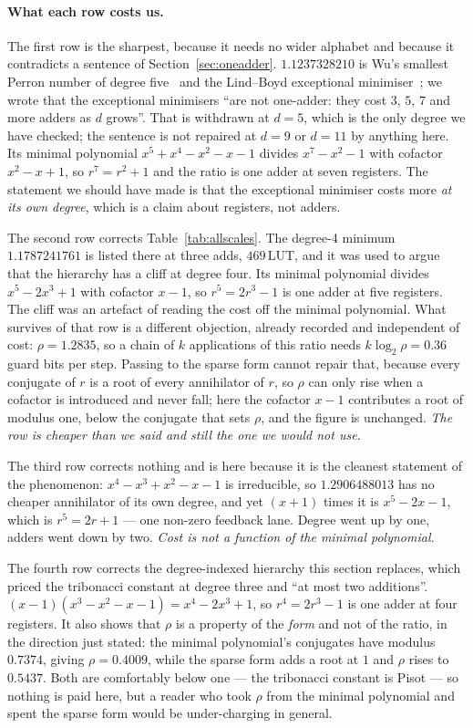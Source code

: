\documentclass[11pt]{article}
\theoremstyle{definition}
\begin{document}
\paragraph{What each row costs us.} The first row is the sharpest, because it
needs no wider alphabet and because it contradicts a sentence of
Section~\ref{sec:oneadder}. $1.1237328210$ is Wu's smallest Perron number of
degree five~\cite{wu2010} and the Lind--Boyd exceptional
minimiser~\cite{boyd1985}; we wrote that the exceptional minimisers ``are not
one-adder: they cost $3$, $5$, $7$ and more adders as $d$ grows''. That is
withdrawn at $d=5$, which is the only degree we have checked; the sentence is
not repaired at $d=9$ or $d=11$ by anything here. Its minimal polynomial
$x^5+x^4-x^2-x-1$ divides $x^7-x^2-1$ with cofactor $x^2-x+1$, so $r^7=r^2+1$
and the ratio is one adder at seven registers. The statement we should have made
is that the exceptional minimiser costs more \emph{at its own degree}, which is
a claim about registers, not adders.

The second row corrects Table~\ref{tab:allscales}. The degree-4 minimum
$1.1787241761$ is listed there at three adds, $469$\,LUT, and it was used to
argue that the hierarchy has a cliff at degree four. Its minimal polynomial
divides $x^5-2x^3+1$ with cofactor $x-1$, so $r^5=2r^3-1$ is one adder at five
registers. The cliff was an artefact of reading the cost off the minimal
polynomial. What survives of that row is a different objection, already recorded
and independent of cost: $\rho=1.2835$, so a chain of $k$ applications of this
ratio needs $k\log_2\rho=0.36$ guard bits per step. Passing to the sparse form
cannot repair that, because every conjugate of $r$ is a root of every
annihilator of $r$, so $\rho$ can only rise when a cofactor is introduced and
never fall; here the cofactor $x-1$ contributes a root of modulus one, below the
conjugate that sets $\rho$, and the figure is unchanged. \emph{The row is
cheaper than we said and still the one we would not use.}

The third row corrects nothing and is here because it is the cleanest statement
of the phenomenon: $x^4-x^3+x^2-x-1$ is irreducible, so $1.2906488013$ has no
cheaper annihilator of its own degree, and yet $(x+1)$ times it is $x^5-2x-1$,
which is $r^5=2r+1$ --- one non-zero feedback lane. Degree went up by one,
adders went down by two. \emph{Cost is not a function of the minimal
polynomial.}

The fourth row corrects the degree-indexed hierarchy this section replaces,
which priced the tribonacci constant at degree three and ``at most two
additions''. $(x-1)(x^3-x^2-x-1) = x^4-2x^3+1$, so $r^4=2r^3-1$ is one adder at
four registers. It also shows that $\rho$ is a property of the \emph{form} and
not of the ratio, in the direction just stated: the minimal polynomial's
conjugates have modulus $0.7374$, giving $\rho=0.4009$, while the sparse form
adds a root at $1$ and $\rho$ rises to $0.5437$. Both are comfortably below one
--- the tribonacci constant is Pisot --- so nothing is paid here, but a reader
who took $\rho$ from the minimal polynomial and spent the sparse form would be
under-charging in general.
\end{document}
